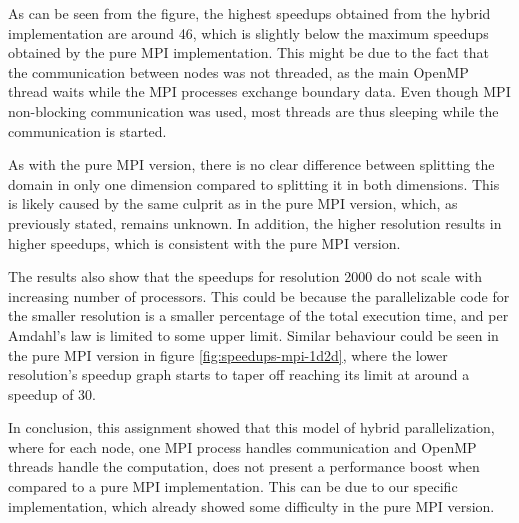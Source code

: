As can be seen from the figure, the highest speedups obtained from the hybrid implementation are around 46, which is slightly below the maximum speedups obtained by the pure MPI implementation. This might be due to the fact that the communication between nodes was not threaded, as the main OpenMP thread waits while the MPI processes exchange boundary data. Even though MPI non-blocking communication was used, most threads are thus sleeping while the communication is started.

As with the pure MPI version, there is no clear difference between splitting the domain in only one dimension compared to splitting it in both dimensions. This is likely caused by the same culprit as in the pure MPI version, which, as previously stated, remains unknown. In addition, the higher resolution results in higher speedups, which is consistent with the pure MPI version. 

The results also show that the speedups for resolution 2000 do not scale with increasing number of processors. This could be because the parallelizable code for the smaller resolution is a smaller percentage of the total execution time, and per Amdahl's law is limited to some upper limit. Similar behaviour could be seen in the pure MPI version in figure \ref{fig:speedups-mpi-1d2d}, where the lower resolution's speedup graph starts to taper off reaching its limit at around a speedup of 30.

In conclusion, this assignment showed that this model of hybrid parallelization, where for each node, one MPI process handles communication and OpenMP threads handle the computation, does not present a performance boost when compared to a pure MPI implementation. This can be due to our specific implementation, which already showed some difficulty in the pure MPI version.


